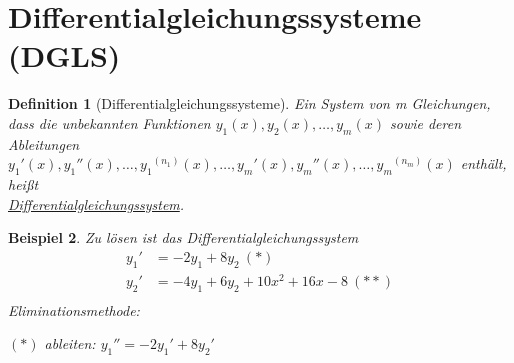 \documentclass[fontset=ubuntu,12pt,a4paper]{scrreprt}
\newtheorem{defi}{Definition}[section]
\newtheorem{beispiel}[defi]{Beispiel}
\begin{document}
     \section{Differentialgleichungssysteme (DGLS)}

     \begin{defi}[Differentialgleichungssysteme]
         Ein System von m Gleichungen, dass die unbekannten Funktionen \(y_1(x),y_2(x),\dots,y_m(x)\) sowie deren Ableitungen \\
         \({y_1}'(x),{y_1}''(x),\dots,{y_1}^{(n_1)}(x),\dots,{y_m}'(x),{y_m}''(x),\dots,{y_m}^{(n_m)}(x)\) enthält, heißt \\ \underline{Differentialgleichungssystem}.
     \end{defi}

     \begin{beispiel}
         Zu lösen ist das Differentialgleichungssystem
         \begin{align*}
             {y_1}' &= -2y_1+8y_2\ (*) \\
             {y_2}' &= -4y_1+6y_2+10x^2+16x-8\ (**) \\
         \end{align*}
         Eliminationsmethode:

         \((*)\) ableiten: \({y_1}'' = -2{y_1}'+8{y_2}'\)


\end{beispiel}
\end{document}

